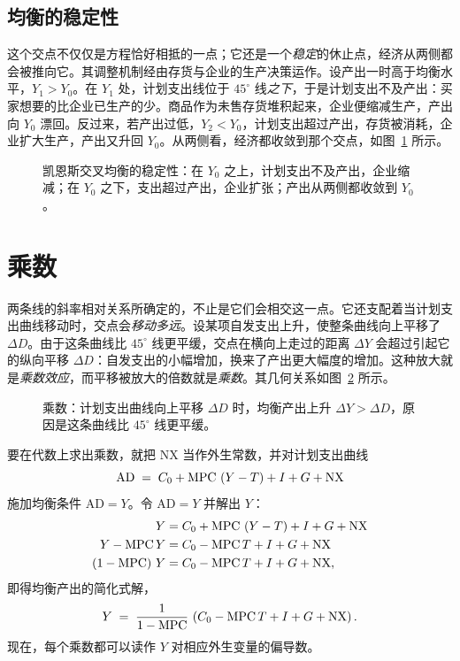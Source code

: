 \subsection{均衡的稳定性}

这个交点不仅仅是方程恰好相抵的一点；它还是一个\emph{稳定}的休止点，经济从两侧都会被推向它。其调整机制经由存货与企业的生产决策运作。设产出一时高于均衡水平，$Y_1 > Y_0$。在 $Y_1$ 处，计划支出线位于 $45^\circ$ 线\emph{之下}，于是计划支出不及产出：买家想要的比企业已生产的少。商品作为未售存货堆积起来，企业便缩减生产，产出向 $Y_0$ 漂回。反过来，若产出过低，$Y_2 < Y_0$，计划支出超过产出，存货被消耗，企业扩大生产，产出又升回 $Y_0$。从两侧看，经济都收敛到那个交点，如图~\ref{fig:macro-13} 所示。

\begin{figure}[h]
\centering

\caption{凯恩斯交叉均衡的稳定性：在 $Y_0$ 之上，计划支出不及产出，企业缩减；在 $Y_0$ 之下，支出超过产出，企业扩张；产出从两侧都收敛到 $Y_0$。}
\label{fig:macro-13}
\end{figure}


\section{乘数}

两条线的斜率相对关系所确定的，不止是它们会相交这一点。它还支配着当计划支出曲线移动时，交点会\emph{移动多远}。设某项自发支出上升，使整条曲线向上平移了 $\Delta D$。由于这条曲线比 $45^\circ$ 线更平缓，交点在横向上走过的距离 $\Delta Y$ 会超过引起它的纵向平移 $\Delta D$：自发支出的小幅增加，换来了产出更大幅度的增加。这种放大就是\emph{乘数效应}，而平移被放大的倍数就是\emph{乘数}。其几何关系如图~\ref{fig:macro-14} 所示。

\begin{figure}[h]
\centering

\caption{乘数：计划支出曲线向上平移 $\Delta D$ 时，均衡产出上升 $\Delta Y > \Delta D$，原因是这条曲线比 $45^\circ$ 线更平缓。}
\label{fig:macro-14}
\end{figure}

要在代数上求出乘数，就把 $\mathrm{NX}$ 当作外生常数，并对计划支出曲线
\[
\mathrm{AD} \;=\; C_0 + \mathrm{MPC}\,\left(Y - T\right) + I + G + \mathrm{NX}
\]
施加均衡条件 $\mathrm{AD} = Y$。令 $\mathrm{AD} = Y$ 并解出 $Y$：
\[
\begin{aligned}
Y &= C_0 + \mathrm{MPC}\,\left(Y - T\right) + I + G + \mathrm{NX}\\
Y - \mathrm{MPC}\,Y &= C_0 - \mathrm{MPC}\,T + I + G + \mathrm{NX}\\
\left(1 - \mathrm{MPC}\right)\,Y &= C_0 - \mathrm{MPC}\,T + I + G + \mathrm{NX},
\end{aligned}
\]
即得均衡产出的简化式解，
\begin{equation}
Y \;=\; \frac{1}{1 - \mathrm{MPC}}\,\left(C_0 - \mathrm{MPC}\,T + I + G + \mathrm{NX}\right).
\label{eq:keynes-Y}
\end{equation}
现在，每个乘数都可以读作 $Y$ 对相应外生变量的偏导数。

